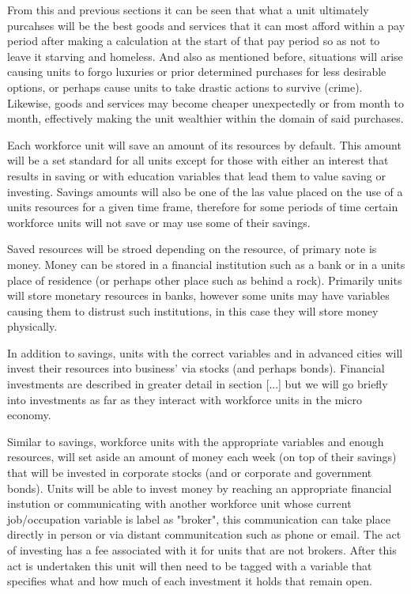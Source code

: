 From this and previous sections it can be seen that what a unit ultimately purcahses will be the best goods and services that it can most afford within a pay period after making a calculation at the start of that pay period so as not to leave it starving and homeless. And also as mentioned before, situations will arise causing units to forgo luxuries or prior determined purchases for less desirable options, or perhaps cause units to take drastic actions to survive (crime). Likewise, goods and services may become cheaper unexpectedly or from month to month, effectively making the unit wealthier within the domain of said purchases.

Each workforce unit will save an amount of its resources by default. This amount will be a set standard for all units except for those with either an interest that results in saving or with education variables that lead them to value saving or investing. Savings amounts will also be one of the las value placed on the use of a units resources for a given time frame, therefore for some periods of time certain workforce units will not save or may use some of their savings.

Saved resources will be stroed depending on the resource, of primary note is money. Money can be stored in a financial institution such as a bank or in a units place of residence (or perhaps other place such as behind a rock). Primarily units will store monetary resources in banks, however some units may have variables causing them to distrust such institutions, in this case they will store money physically. 


In addition to savings, units with the correct variables and in advanced cities will invest their resources into business' via stocks (and perhaps bonds). Financial investments are described in greater detail in section [...] but we will go briefly into investments as far as they interact with workforce units in the micro economy.

Similar to savings, workforce units with the appropriate variables and enough resources, will set aside an amount of money each week (on top of their savings) that will be invested in corporate stocks  (and or corporate and government bonds). Units will be able to invest money by reaching an appropriate financial instution or communicating with another workforce unit whose current job/occupation variable is label as "broker", this communication can take place directly in person or via distant communitcation such as phone or email. The act of investing has a fee associated with it for units that are not brokers. After this act is undertaken this unit will then need to be tagged with a variable that specifies what and how much of each investment it holds that remain open.     

